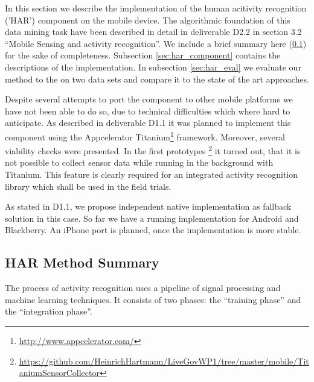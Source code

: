 \label{sec:HAR}

\newcommand{\IR}{\mathbb{R}}

In this section we describe the implementation of the human acitivity
recognition ('HAR') component on the mobile device.  The algorithmic
foundation of this data mining task have been described in detail in
deliverable D2.2 in section 3.2 ``Mobile Sensing and activity
recognition''. We include a brief summary here (\ref{sec:har_method})
for the sake of completeness. Subsection \ref{sec:har_component}
contains the descriptions of the implementation. In subsection
\ref{sec:har_eval} we evaluate our method to the on two data sets and
compare it to the state of the art approaches.

Despite several attempts to port the component to other mobile
platforms we have not been able to do so, due to technical
difficulties which where hard to anticipate. As described in
deliverable D1.1 it was planned to implement this component using the
Appcelerator Titanium\footnote{\url{http://www.appcelerator.com/}}
framework. Moreover, several viability checks were presented. In the
first prototypes
\footnote{\url{https://github.com/HeinrichHartmann/LiveGovWP1/tree/master/mobile/TitaniumSensorCollector}}
it turned out, that it is not possible to collect sensor data while
running in the background with Titanium. This feature is clearly
required for an integrated activity recognition library which shall be
used in the field trials.

As stated in D1.1, we propose independent native implementation as
fallback solution in this case. So far we have a running
implementation for Android and Blackberry. An iPhone port is planned,
once the implementation is more stable.


\subsection{HAR Method Summary}\label{sec:har_method}

The process of activity recognition uses a pipeline of signal
processing and machine learning techniques. It consists of two phases:
the ``training phase'' and the ``integration phase''. 

